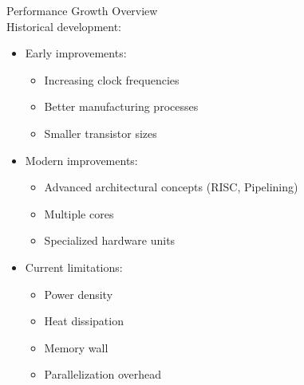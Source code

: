 \begin{concept}{Performance Growth Overview}\\
Historical development:
\begin{itemize}
  \item Early improvements:
    \begin{itemize}
      \item Increasing clock frequencies
      \item Better manufacturing processes
      \item Smaller transistor sizes
    \end{itemize}
  \item Modern improvements:
    \begin{itemize}
      \item Advanced architectural concepts (RISC, Pipelining)
      \item Multiple cores
      \item Specialized hardware units
    \end{itemize}
  \item Current limitations:
    \begin{itemize}
      \item Power density
      \item Heat dissipation
      \item Memory wall
      \item Parallelization overhead
    \end{itemize}
\end{itemize}
\end{concept}


